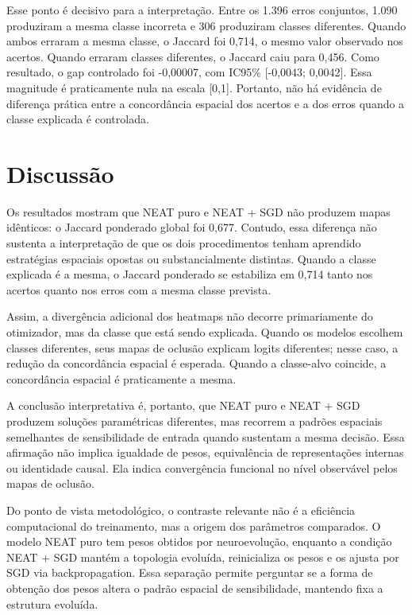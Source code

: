 Esse ponto \'{e} decisivo para a interpreta\c{c}\~ao. Entre os 1.396 erros conjuntos,
1.090 produziram a mesma classe incorreta e 306 produziram classes diferentes.
Quando ambos erraram a mesma classe, o Jaccard foi 0,714, o mesmo valor observado
nos acertos. Quando erraram classes diferentes, o Jaccard caiu para 0,456. Como
resultado, o gap controlado foi -0,00007, com IC95\% [-0,0043; 0,0042]. Essa
magnitude \'{e} praticamente nula na escala [0,1]. Portanto, n\~ao h\'a evid\^encia de
diferen\c{c}a pr\'atica entre a concord\^ancia espacial dos acertos e a dos erros
quando a classe explicada \'{e} controlada.

\section{Discuss\~ao}

Os resultados mostram que NEAT puro e NEAT + SGD n\~ao produzem mapas id\^enticos:
o Jaccard ponderado global foi 0,677. Contudo, essa diferen\c{c}a n\~ao sustenta a
interpreta\c{c}\~ao de que os dois procedimentos tenham aprendido estrat\'egias
espaciais opostas ou substancialmente distintas. Quando a classe explicada \'{e} a
mesma, o Jaccard ponderado se estabiliza em 0,714 tanto nos acertos quanto nos
erros com a mesma classe prevista.

Assim, a diverg\^encia adicional dos heatmaps n\~ao decorre primariamente do
otimizador, mas da classe que est\'a sendo explicada. Quando os modelos escolhem
classes diferentes, seus mapas de oclus\~ao explicam logits diferentes; nesse
caso, a redu\c{c}\~ao da concord\^ancia espacial \'{e} esperada. Quando a classe-alvo
coincide, a concord\^ancia espacial \'{e} praticamente a mesma.

A conclus\~ao interpretativa \'{e}, portanto, que NEAT puro e NEAT + SGD produzem
solu\c{c}\~oes param\'etricas diferentes, mas recorrem a padr\~oes espaciais
semelhantes de sensibilidade de entrada quando sustentam a mesma decis\~ao. Essa
afirma\c{c}\~ao n\~ao implica igualdade de pesos, equival\^encia de representa\c{c}\~oes
internas ou identidade causal. Ela indica converg\^encia funcional no n\'ivel
observ\'avel pelos mapas de oclus\~ao.

Do ponto de vista metodol\'ogico, o contraste relevante n\~ao \'{e} a efici\^encia
computacional do treinamento, mas a origem dos par\^ametros comparados. O modelo
NEAT puro tem pesos obtidos por neuroevolu\c{c}\~ao, enquanto a condi\c{c}\~ao NEAT +
SGD mant\'em a topologia evolu\'ida, reinicializa os pesos e os ajusta por SGD via
backpropagation. Essa separa\c{c}\~ao permite perguntar se a forma de obten\c{c}\~ao dos
pesos altera o padr\~ao espacial de sensibilidade, mantendo fixa a estrutura
evolu\'ida.

